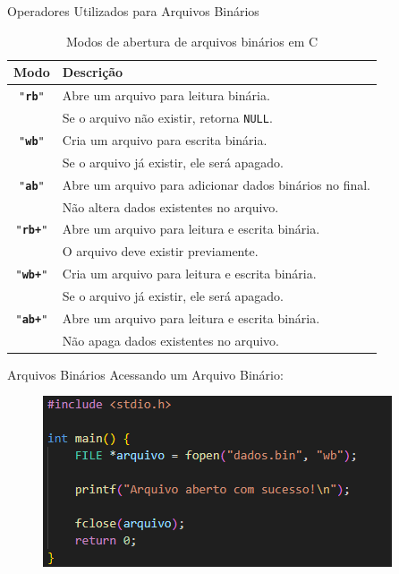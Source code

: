\begin{frame}{Operadores Utilizados para Arquivos Binários}
    \begin{table}[h]
    \centering
    \begin{tabular}{|c|l|}
        \hline
        \textbf{Modo} & \textbf{Descrição} \\
        \hline
        \texttt{"\textbf{rb}"}   & Abre um arquivo para leitura binária.\\
                        & Se o arquivo não existir, retorna \texttt{NULL}. \\
        \hline
        \texttt{"\textbf{wb}"}   & Cria um arquivo para escrita binária. \\
                        & Se o arquivo já existir, ele será apagado. \\
        \hline
        \texttt{"\textbf{ab}"}   & Abre um arquivo para adicionar dados binários no final. \\
                        & Não altera dados existentes no arquivo. \\
        \hline
        \texttt{"\textbf{rb+}"}  & Abre um arquivo para leitura e escrita binária. \\
                        & O arquivo deve existir previamente. \\
        \hline
        \texttt{"\textbf{wb+}"}  & Cria um arquivo para leitura e escrita binária. \\
                        & Se o arquivo já existir, ele será apagado. \\
        \hline
        \texttt{"\textbf{ab+}"}  & Abre um arquivo para leitura e escrita binária. \\
                        & Não apaga dados existentes no arquivo. \\
        \hline
    \end{tabular}
    \caption{Modos de abertura de arquivos binários em C}
    \label{tab:modos_arquivo_binario}
\end{table}
\end{frame}

\begin{frame}{Arquivos Binários}
Acessando um Arquivo Binário:
\begin{figure}
    \centering
    \includegraphics[width=0.75\linewidth]{figuras/bin2.png}
\end{figure}
    
\end{frame}

